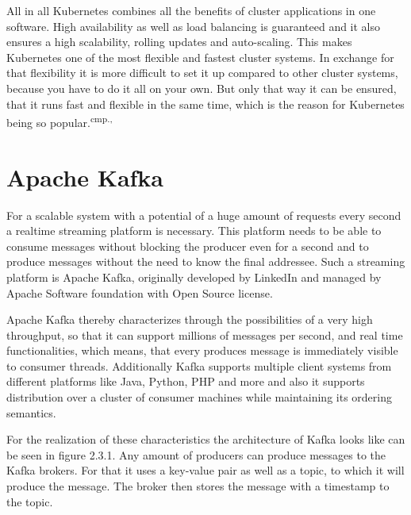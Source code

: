 
All in all Kubernetes combines all the benefits of cluster applications in one software. High availability as well as load balancing is guaranteed and it also ensures a high scalability, rolling updates and auto-scaling. This makes Kubernetes one of the most flexible and fastest cluster systems. In exchange for that flexibility it is more difficult to set it up compared to other cluster systems, because you have to do it all on your own. But only that way it can be ensured, that it runs fast and flexible in the same time, which is the reason for Kubernetes being so popular.\textsuperscript{cmp.\cite{19}, \cite{20}}


\section{Apache Kafka}

For a scalable system with a potential of a huge amount of requests every second a realtime streaming platform is necessary. This platform needs to be able to consume messages without blocking the producer even for a second and to produce messages without the need to know the final addressee. Such a streaming platform is Apache Kafka, originally developed by LinkedIn and managed by Apache Software foundation with Open Source license.


Apache Kafka thereby characterizes through the possibilities of a very high throughput, so that it can support millions of messages per second, and real time functionalities, which means, that every produces message is immediately visible to consumer threads. Additionally Kafka supports multiple client systems from different platforms like Java, Python, PHP and more and also it supports distribution over a cluster of consumer machines while maintaining its ordering semantics.


For the realization of these characteristics the architecture of Kafka looks like can be seen in figure 2.3.1. Any amount of producers can produce messages to the Kafka brokers. For that it uses a key-value pair as well as a topic, to which it will produce the message. The broker then stores the message with a timestamp to the topic. 

